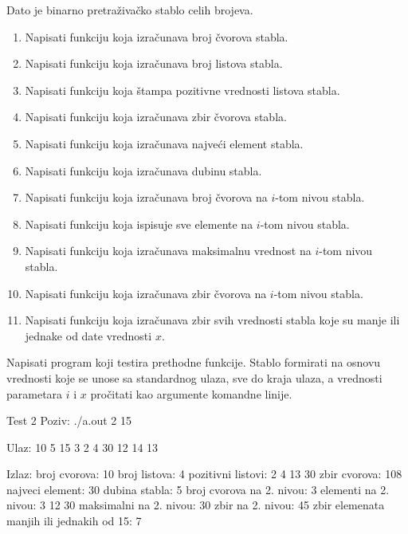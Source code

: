 \begin{Answer}[ref=709]
\end{Answer}


\begin{Exercise}[label=710]
Dato je binarno pretraživačko stablo celih brojeva.
\begin{enumerate}
\item Napisati funkciju koja izračunava broj čvorova stabla.
\item Napisati funkciju koja izračunava broj listova stabla.
\item Napisati funkciju koja štampa pozitivne vrednosti listova stabla.
\item Napisati funkciju koja izračunava zbir čvorova stabla.
\item Napisati funkciju koja izračunava najveći element stabla.
\item Napisati funkciju koja izračunava dubinu stabla.
\item Napisati funkciju koja izračunava broj čvorova na $i$-tom nivou stabla.
\item Napisati funkciju koja ispisuje sve elemente na $i$-tom nivou stabla.
\item Napisati funkciju koja izračunava maksimalnu vrednost na $i$-tom nivou stabla.
\item Napisati funkciju koja izračunava zbir čvorova na $i$-tom nivou stabla.
\item Napisati funkciju koja izračunava zbir svih vrednosti stabla koje su manje ili jednake od date vrednosti $x$.
\end{enumerate}

Napisati program koji testira prethodne funkcije. Stablo formirati na osnovu vrednosti koje se unose
sa standardnog ulaza, sve do kraja ulaza, a vrednosti parametara $i$ i $x$ pročitati kao argumente komandne linije. 


\begin{maxitest}
\begin{test}{Test 2}
Poziv: ./a.out 2 15

Ulaz: 
10 5 15 3 2 4 30 12 14 13

Izlaz: 
broj cvorova: 10
broj listova: 4
pozitivni listovi: 2 4 13 30
zbir cvorova: 108
najveci element: 30
dubina stabla: 5
broj cvorova na 2. nivou: 3
elementi na 2. nivou: 3 12 30
maksimalni na 2. nivou: 30
zbir na 2. nivou: 45
zbir elemenata manjih ili jednakih od 15: 7
\end{test}
\end{maxitest}

\end{Exercise}

